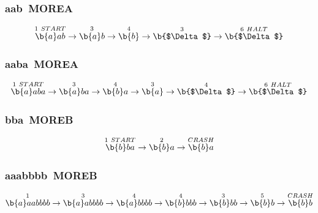 \documentclass[12pt]{article}
\begin{document}
\subsubsection{aab~MOREA}
\[
\overset{1~START}{\b{a}ab}\rightarrow
\overset{3}{\b{a}b}\rightarrow
\overset{4}{\b{b}}\rightarrow
\overset{3}{\b{$\Delta$}}\rightarrow
\overset{6~HALT}{\b{$\Delta$}}
\]

\subsubsection{aaba~MOREA}
\[
\overset{1~START}{\b{a}aba}\rightarrow
\overset{3}{\b{a}ba}\rightarrow
\overset{4}{\b{b}a}\rightarrow
\overset{3}{\b{a}}\rightarrow
\overset{4}{\b{$\Delta$}}\rightarrow
\overset{6~HALT}{\b{$\Delta$}}
\]

\subsubsection{bba~MOREB}
\[
\overset{1~START}{\b{b}ba}\rightarrow
\overset{2}{\b{b}a}\rightarrow
\overset{CRASH}{\b{b}a}
\]

\subsubsection{aaabbbb~MOREB}
\[
\overset{1}{\b{a}aabbbb}\rightarrow
\overset{3}{\b{a}abbbb}\rightarrow
\overset{4}{\b{a}bbbb}\rightarrow
\overset{4}{\b{b}bbb}\rightarrow
\overset{3}{\b{b}bb}\rightarrow
\overset{5}{\b{b}b}\rightarrow
\overset{CRASH}{\b{b}b}
\]
\end{document}
